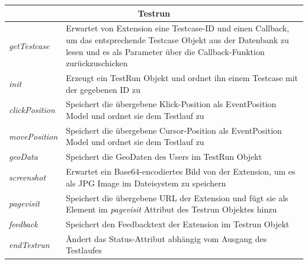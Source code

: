 {\footnotesize
\begin{tabular}{ p{3cm} p{11.5cm} }
  \hline
  \multicolumn{2}{c}{\textbf{Testrun}} \\
  \hline
  \textit{getTestcase} & Erwartet von Extension eine Testcase-ID und einen Callback, um das entsprechende Testcase Objekt aus der Datenbank zu lesen und es als Parameter über die Callback-Funktion zurückzuschicken\vspace{0.2cm}\\
  \textit{init} & Erzeugt ein TestRun Objekt und ordnet ihn einem Testcase mit der gegebenen ID zu\vspace{0.2cm}\\
  \textit{clickPosition} & Speichert die übergebene Klick-Position als EventPosition Model und ordnet sie dem Testlauf zu\vspace{0.2cm}\\
  \textit{movePosition} & Speichert die übergebene Cursor-Position als EventPosition Model und ordnet sie dem Testlauf zu\vspace{0.2cm}\\
  \textit{geoData} & Speichert die GeoDaten des Users im TestRun Objekt\vspace{0.2cm}\\
  \textit{screenshot} & Erwartet ein Base64-encodiertes Bild von der Extension, um es als JPG Image im Dateisystem zu speichern\vspace{0.2cm}\\
  \textit{pagevisit} & Speichert die übergebene URL der Extension und fügt sie als Element im \textit{pagevisit} Attribut des Testrun Objektes hinzu\vspace{0.2cm}\\
  \textit{feedback} & Speichert den Feedbacktext der Extension im Testrun Objekt\vspace{0.2cm}\\
  \textit{endTestrun} & Ändert das Status-Attribut abhängig vom Ausgang des Testlaufes\vspace{0.2cm}\\
  \hline
\end{tabular}
}